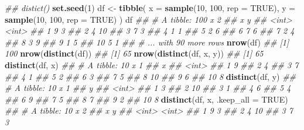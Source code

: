 \documentclass[
]{book}
\newenvironment{Shaded}{\begin{snugshade}}{\end{snugshade}}
\newcommand{\CommentTok}[1]{\textcolor[rgb]{0.56,0.35,0.01}{\textit{#1}}}
\newcommand{\DataTypeTok}[1]{\textcolor[rgb]{0.13,0.29,0.53}{#1}}
\newcommand{\DecValTok}[1]{\textcolor[rgb]{0.00,0.00,0.81}{#1}}
\newcommand{\KeywordTok}[1]{\textcolor[rgb]{0.13,0.29,0.53}{\textbf{#1}}}
\newcommand{\NormalTok}[1]{#1}
\newcommand{\OtherTok}[1]{\textcolor[rgb]{0.56,0.35,0.01}{#1}}
\newcommand{\StringTok}[1]{\textcolor[rgb]{0.31,0.60,0.02}{#1}}
\begin{document}
\begin{Shaded}
\begin{Highlighting}[]
\CommentTok{\#\# distict()}
\KeywordTok{set.seed}\NormalTok{(}\DecValTok{1}\NormalTok{)}
\NormalTok{df \textless{}{-}}\StringTok{ }\KeywordTok{tibble}\NormalTok{(}
  \DataTypeTok{x =} \KeywordTok{sample}\NormalTok{(}\DecValTok{10}\NormalTok{, }\DecValTok{100}\NormalTok{, }\DataTypeTok{rep =} \OtherTok{TRUE}\NormalTok{),}
  \DataTypeTok{y =} \KeywordTok{sample}\NormalTok{(}\DecValTok{10}\NormalTok{, }\DecValTok{100}\NormalTok{, }\DataTypeTok{rep =} \OtherTok{TRUE}\NormalTok{)}
\NormalTok{)}
\NormalTok{df}
\CommentTok{\#\# \# A tibble: 100 x 2}
\CommentTok{\#\#        x     y}
\CommentTok{\#\#    \textless{}int\textgreater{} \textless{}int\textgreater{}}
\CommentTok{\#\#  1     9     3}
\CommentTok{\#\#  2     4    10}
\CommentTok{\#\#  3     7     3}
\CommentTok{\#\#  4     1     1}
\CommentTok{\#\#  5     2     6}
\CommentTok{\#\#  6     7     6}
\CommentTok{\#\#  7     2     4}
\CommentTok{\#\#  8     3     9}
\CommentTok{\#\#  9     1     5}
\CommentTok{\#\# 10     5     1}
\CommentTok{\#\# \# ... with 90 more rows}
\KeywordTok{nrow}\NormalTok{(df)}
\CommentTok{\#\# [1] 100}
\KeywordTok{nrow}\NormalTok{(}\KeywordTok{distinct}\NormalTok{(df))}
\CommentTok{\#\# [1] 65}
\KeywordTok{nrow}\NormalTok{(}\KeywordTok{distinct}\NormalTok{(df, x, y))}
\CommentTok{\#\# [1] 65}
\KeywordTok{distinct}\NormalTok{(df, x)}
\CommentTok{\#\# \# A tibble: 10 x 1}
\CommentTok{\#\#        x}
\CommentTok{\#\#    \textless{}int\textgreater{}}
\CommentTok{\#\#  1     9}
\CommentTok{\#\#  2     4}
\CommentTok{\#\#  3     7}
\CommentTok{\#\#  4     1}
\CommentTok{\#\#  5     2}
\CommentTok{\#\#  6     3}
\CommentTok{\#\#  7     5}
\CommentTok{\#\#  8    10}
\CommentTok{\#\#  9     6}
\CommentTok{\#\# 10     8}
\KeywordTok{distinct}\NormalTok{(df, y)}
\CommentTok{\#\# \# A tibble: 10 x 1}
\CommentTok{\#\#        y}
\CommentTok{\#\#    \textless{}int\textgreater{}}
\CommentTok{\#\#  1     3}
\CommentTok{\#\#  2    10}
\CommentTok{\#\#  3     1}
\CommentTok{\#\#  4     6}
\CommentTok{\#\#  5     4}
\CommentTok{\#\#  6     9}
\CommentTok{\#\#  7     5}
\CommentTok{\#\#  8     7}
\CommentTok{\#\#  9     2}
\CommentTok{\#\# 10     8}
\KeywordTok{distinct}\NormalTok{(df, x, }\DataTypeTok{.keep\_all =} \OtherTok{TRUE}\NormalTok{)}
\CommentTok{\#\# \# A tibble: 10 x 2}
\CommentTok{\#\#        x     y}
\CommentTok{\#\#    \textless{}int\textgreater{} \textless{}int\textgreater{}}
\CommentTok{\#\#  1     9     3}
\CommentTok{\#\#  2     4    10}
\CommentTok{\#\#  3     7     3}

\end{Highlighting}
\end{Shaded}
\end{document}
